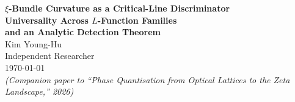 \documentclass[11pt, a4paper]{article}
\theoremstyle{plain}
\theoremstyle{definition}
\begin{document}
\begin{center}
  {\LARGE\bfseries $\xi$-Bundle Curvature as a Critical-Line Discriminator}\\[6pt]
  {\large\bfseries Universality Across $L$-Function Families\\[2pt]
   and an Analytic Detection Theorem}\\[18pt]
  {\large Kim Young-Hu}\\[4pt]
  {\normalsize Independent Researcher}\\[4pt]
  {\small\today}\\[4pt]
  {\small\textit{(Companion paper to ``Phase Quantisation from Optical Lattices
   to the Zeta Landscape,'' 2026)}}
\end{center}

\vspace{1.5em}
\end{document}
